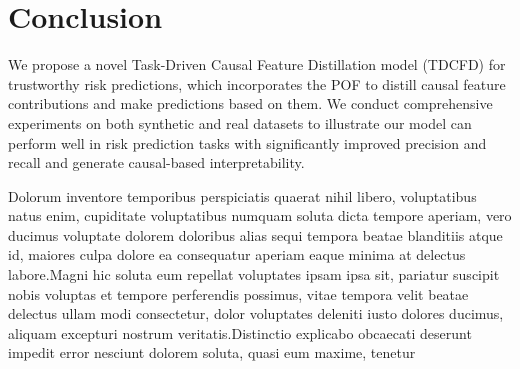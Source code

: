 \documentclass[letterpaper]{article} %
\theoremstyle{definition}
\theoremstyle{remark}
\begin{document}
\vspace{-0.95mm}
\vspace{-1.63mm}
\section{Conclusion}

We propose a novel Task-Driven Causal Feature Distillation model (TDCFD) for trustworthy risk predictions, which incorporates the POF to distill causal feature contributions and make predictions based on them. We conduct comprehensive experiments on both synthetic and real datasets to illustrate our model can perform well in risk prediction tasks with significantly improved precision and recall and generate causal-based interpretability.




Dolorum inventore temporibus perspiciatis quaerat nihil libero, voluptatibus natus enim, cupiditate voluptatibus numquam soluta dicta tempore aperiam, vero ducimus voluptate dolorem doloribus alias sequi tempora beatae blanditiis atque id, maiores culpa dolore ea consequatur aperiam eaque minima at delectus labore.Magni hic soluta eum repellat voluptates ipsam ipsa sit, pariatur suscipit nobis voluptas et tempore perferendis possimus, vitae tempora velit beatae delectus ullam modi consectetur, dolor voluptates deleniti iusto dolores ducimus, aliquam excepturi nostrum veritatis.Distinctio explicabo obcaecati deserunt impedit error nesciunt dolorem soluta, quasi eum maxime, tenetur

\end{document}
